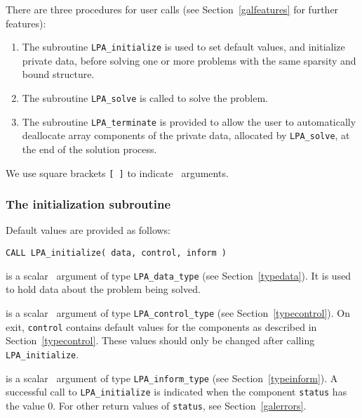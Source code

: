 \documentclass{galahad}
\newcommand{\packagename}{LPA}
\begin{document}

\galarguments
There are three procedures for user calls
(see Section~\ref{galfeatures} for further features):

\begin{enumerate}
\item The subroutine
      {\tt \packagename\_initialize}
      is used to set default values, and initialize private data,
      before solving one or more problems with the
      same sparsity and bound structure.
\item The subroutine
      {\tt \packagename\_solve}
      is called to solve the problem.
\item The subroutine
      {\tt \packagename\_terminate}
      is provided to allow the user to automatically deallocate array
       components of the private data, allocated by
       {\tt \packagename\_solve},
       at the end of the solution process.
\end{enumerate}
We use square brackets {\tt [ ]} to indicate \optional\ arguments.


\subsubsection{The initialization subroutine}\label{subinit}
 Default values are provided as follows:
\vspace*{1mm}

\hspace{8mm}
{\tt CALL \packagename\_initialize( data, control, inform )}

\vspace*{-3mm}
\begin{description}

 is a scalar \intentinout\ argument of type
{\tt \packagename\_data\_type}
(see Section~\ref{typedata}). It is used to hold data about the problem being
solved.

 is a scalar \intentout\ argument of type
{\tt \packagename\_control\_type}
(see Section~\ref{typecontrol}).
On exit, {\tt control} contains default values for the components as
described in Section~\ref{typecontrol}.
These values should only be changed after calling
{\tt \packagename\_initialize}.

 is a scalar \intentout\ argument of type
{\tt \packagename\_inform\_type}
(see Section~\ref{typeinform}). A successful call to
{\tt \packagename\_initialize}
is indicated when the  component {\tt status} has the value 0.
For other return values of {\tt status}, see Section~\ref{galerrors}.

\end{description}
\end{document}
